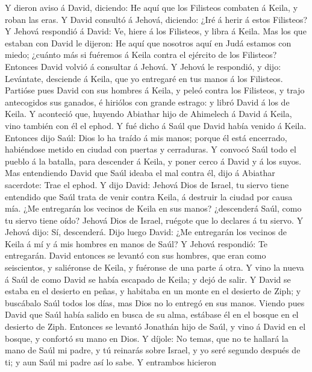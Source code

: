  Y dieron aviso á David, diciendo: He aquí que los Filisteos
combaten á Keila, y roban las eras.  Y David consultó á
Jehová, diciendo: ¿Iré á herir á estos Filisteos? Y Jehová respondió á
David: Ve, hiere á los Filisteos, y libra á Keila.  Mas los
que estaban con David le dijeron: He aquí que nosotros aquí en Judá
estamos con miedo; ¿cuánto más si fuéremos á Keila contra el ejército de
los Filisteos?  Entonces David volvió á consultar á Jehová.
Y Jehová le respondió, y dijo: Levántate, desciende á Keila, que yo
entregaré en tus manos á los Filisteos.  Partióse pues David
con sus hombres á Keila, y peleó contra los Filisteos, y trajo
antecogidos sus ganados, é hiriólos con grande estrago: y libró David á
los de Keila.  Y aconteció que, huyendo Abiathar hijo de
Ahimelech á David á Keila, vino también con él el ephod.  Y
fué dicho á Saúl que David había venido á Keila. Entonces dijo Saúl:
Dios lo ha traído á mis manos; porque él está encerrado, habiéndose
metido en ciudad con puertas y cerraduras.  Y convocó Saúl
todo el pueblo á la batalla, para descender á Keila, y poner cerco á
David y á los suyos.  Mas entendiendo David que Saúl ideaba
el mal contra él, dijo á Abiathar sacerdote: Trae el ephod.
 Y dijo David: Jehová Dios de Israel, tu siervo tiene
entendido que Saúl trata de venir contra Keila, á destruir la ciudad por
causa mía.  ¿Me entregarán los vecinos de Keila en sus
manos? ¿descenderá Saúl, como tu siervo tiene oído? Jehová Dios de
Israel, ruégote que lo declares á tu siervo. Y Jehová dijo: Sí,
descenderá.  Dijo luego David: ¿Me entregarán los vecinos
de Keila á mí y á mis hombres en manos de Saúl? Y Jehová respondió: Te
entregarán.  David entonces se levantó con sus hombres, que
eran como seiscientos, y saliéronse de Keila, y fuéronse de una parte á
otra. Y vino la nueva á Saúl de como David se había escapado de Keila; y
dejó de salir.  Y David se estaba en el desierto en peñas,
y habitaba en un monte en el desierto de Ziph; y buscábalo Saúl todos
los días, mas Dios no lo entregó en sus manos.  Viendo pues
David que Saúl había salido en busca de su alma, estábase él en el
bosque en el desierto de Ziph.  Entonces se levantó
Jonathán hijo de Saúl, y vino á David en el bosque, y confortó su mano
en Dios.  Y díjole: No temas, que no te hallará la mano de
Saúl mi padre, y tú reinarás sobre Israel, y yo seré segundo después de
ti; y aun Saúl mi padre así lo sabe.  Y entrambos hicieron

